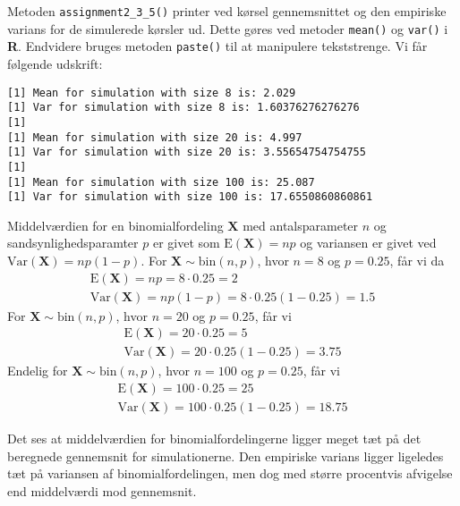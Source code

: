 {

Metoden \texttt{assignment2\_3\_5()} printer ved kørsel gennemsnittet og
den empiriske varians for de simulerede kørsler ud. Dette gøres ved
metoder \texttt{mean()} og \texttt{var()} i \textbf{R}. Endvidere bruges
metoden \texttt{paste()} til at manipulere tekststrenge. Vi får følgende
udskrift:

\begin{verbatim}
[1] Mean for simulation with size 8 is: 2.029
[1] Var for simulation with size 8 is: 1.60376276276276
[1]
[1] Mean for simulation with size 20 is: 4.997
[1] Var for simulation with size 20 is: 3.55654754754755
[1]
[1] Mean for simulation with size 100 is: 25.087
[1] Var for simulation with size 100 is: 17.6550860860861
\end{verbatim}

Middelværdien for en binomialfordeling $\mathbf{X}$ med antalsparameter $n$ og
sandsynlighedsparamter $p$ er givet som $\textrm{E}(\mathbf{X}) = np$ og
variansen er givet ved $\textrm{Var}(\mathbf{X}) = np(1 - p)$. For
$\mathbf{X} \sim{ \textrm{bin} \left( n,p \right) }$, hvor $n = 8$ og $p
= 0.25$,
får vi da
\begin{eqnarray}
    \textrm{E}(\mathbf{X}) = np = 8\cdot0.25 = 2 \\
    \textrm{Var}(\mathbf{X}) = np(1 - p) = 8\cdot0.25(1 - 0.25) = 1.5
\end{eqnarray}
For $\mathbf{X} \sim{ \textrm{bin} \left( n,p \right) }$, hvor $n = 20$
og $p = 0.25$, får vi
\begin{eqnarray}
    \textrm{E}(\mathbf{X}) = 20\cdot0.25 = 5 \\
    \textrm{Var}(\mathbf{X}) = 20\cdot0.25(1 - 0.25) = 3.75
\end{eqnarray}
Endelig for $\mathbf{X} \sim{ \textrm{bin} \left( n,p \right) }$, hvor $n
= 100$ og $p = 0.25$, får vi
\begin{eqnarray}
    \textrm{E}(\mathbf{X}) = 100\cdot 0.25 = 25 \\
    \textrm{Var}(\mathbf{X}) = 100\cdot0.25(1 - 0.25) = 18.75
\end{eqnarray}

Det ses at middelværdien for binomialfordelingerne ligger meget tæt på
det beregnede gennemsnit for simulationerne. Den empiriske varians ligger
ligeledes tæt på variansen af binomialfordelingen, men dog med større
procentvis afvigelse end middelværdi mod gennemsnit.

}
